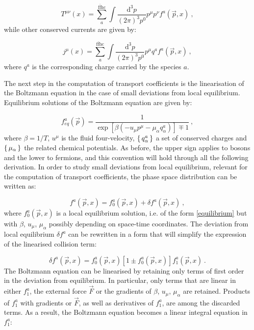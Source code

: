 \begin{equation}
T^{\mu\nu}(x) = \sum_a^{\mathrm{f \bar f h c}} \int \frac{\mathrm d^3 p}{(2 \pi)^3 p^0} p^{\mu} p^{\nu} f^a(\vec p, x) \: ,
\label{Tmunu_kinetic}
\end{equation}
%
while other conserved currents are given by:

\begin{equation}
j^{\mu}(x) = \sum_a^{\mathrm{f \bar f h c}}\int \frac{\mathrm d^3 p}{(2 \pi)^3 p^0} p^{\mu} q^a f^a(\vec p, x) \: ,
\label{jmu_kinetic}
\end{equation}
%
where $q^a$ is the corresponding charge carried by the species $a$.



The next step in the computation of transport coefficients is the linearisation of the Boltzmann equation in the case of small deviations from local equilibrium. Equilibrium solutions of the Boltzmann equation are given by:

\begin{equation}
f^a_{eq}(\vec p) = \frac{1}{\exp[\beta(- u_{\mu}p^{\mu} - \mu_{\alpha}q_{\alpha}^a)] \mp 1} \: ,
\label{equilibrium}
\end{equation}
%
where $\beta = 1/T$, $u^{\mu}$ is the fluid four-velocity, $\set{q^a_{\alpha}}$ a set of conserved charges and $\set{\mu_{\alpha}}$ the related chemical potentials. As before, the upper sign applies to bosons and the lower to fermions, and this convention will hold through all the following derivation. In order to study small deviations from local equilibrium, relevant for the computation of transport coefficients, the phase space distribution can be written as:

\begin{equation}
f^a(\vec p, x) = f_0^a(\vec p, x) + \delta f^a (\vec p, x) \: ,
\end{equation}
%
where $f_0^a(\vec p, x)$ is a local equilibrium solution, i.e. of the form \ref{equilibrium} but with $\beta$, $u_{\mu}$, $\mu_{\alpha}$ possibly depending on space-time coordinates. The deviation from local equilibrium $\delta f^a$ can be rewritten in a form that will simplify the expression of the linearised collision term:

\begin{equation}
 \delta f^a (\vec p, x)= f_0^a(\vec p, x) [1 \pm f_0^a(\vec p, x)] f_1^a(\vec p, x) \: .
\end{equation}
%
The Boltzmann equation can be linearised by retaining only terms of first order in the deviation from equilibrium. In particular, only terms that are linear in either $f^a_1$, the external force $\vec F$ or the gradients of $\beta$, $u_{\mu}$, $\mu_{\alpha}$ are retained. Products of $f^a_1$ with gradients or $\vec F$, as well as derivatives of $f^a_1$, are among the discarded terms. As a result, the Boltzmann equation becomes a linear integral equation in $f^a_1$:

